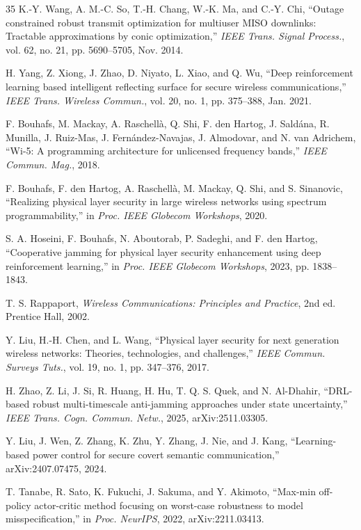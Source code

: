 \documentclass[conference]{IEEEtran}
\begin{document}
\begin{thebibliography}{35}
K.-Y. Wang, A. M.-C. So, T.-H. Chang, W.-K. Ma, and C.-Y. Chi, ``Outage constrained robust transmit optimization for multiuser MISO downlinks: Tractable approximations by conic optimization,'' \emph{IEEE Trans. Signal Process.}, vol. 62, no. 21, pp. 5690--5705, Nov. 2014.

H. Yang, Z. Xiong, J. Zhao, D. Niyato, L. Xiao, and Q. Wu, ``Deep reinforcement learning based intelligent reflecting surface for secure wireless communications,'' \emph{IEEE Trans. Wireless Commun.}, vol. 20, no. 1, pp. 375--388, Jan. 2021.

F. Bouhafs, M. Mackay, A. Raschell\`a, Q. Shi, F. den Hartog, J. Sald\'ana, R. Munilla, J. Ruiz-Mas, J. Fern\'andez-Navajas, J. Almodovar, and N. van Adrichem, ``Wi-5: A programming architecture for unlicensed frequency bands,'' \emph{IEEE Commun. Mag.}, 2018.

F. Bouhafs, F. den Hartog, A. Raschell\`a, M. Mackay, Q. Shi, and S. Sinanovic, ``Realizing physical layer security in large wireless networks using spectrum programmability,'' in \emph{Proc. IEEE Globecom Workshops}, 2020.

S. A. Hoseini, F. Bouhafs, N. Aboutorab, P. Sadeghi, and F. den Hartog, ``Cooperative jamming for physical layer security enhancement using deep reinforcement learning,'' in \emph{Proc. IEEE Globecom Workshops}, 2023, pp. 1838--1843.

T. S. Rappaport, \emph{Wireless Communications: Principles and Practice}, 2nd ed. Prentice Hall, 2002.

Y. Liu, H.-H. Chen, and L. Wang, ``Physical layer security for next generation wireless networks: Theories, technologies, and challenges,'' \emph{IEEE Commun. Surveys Tuts.}, vol. 19, no. 1, pp. 347--376, 2017.

H. Zhao, Z. Li, J. Si, R. Huang, H. Hu, T. Q. S. Quek, and N. Al-Dhahir, ``DRL-based robust multi-timescale anti-jamming approaches under state uncertainty,'' \emph{IEEE Trans. Cogn. Commun. Netw.}, 2025, arXiv:2511.03305.

Y. Liu, J. Wen, Z. Zhang, K. Zhu, Y. Zhang, J. Nie, and J. Kang, ``Learning-based power control for secure covert semantic communication,'' arXiv:2407.07475, 2024.

T. Tanabe, R. Sato, K. Fukuchi, J. Sakuma, and Y. Akimoto, ``Max-min off-policy actor-critic method focusing on worst-case robustness to model misspecification,'' in \emph{Proc. NeurIPS}, 2022, arXiv:2211.03413.


\end{thebibliography}
\end{document}
